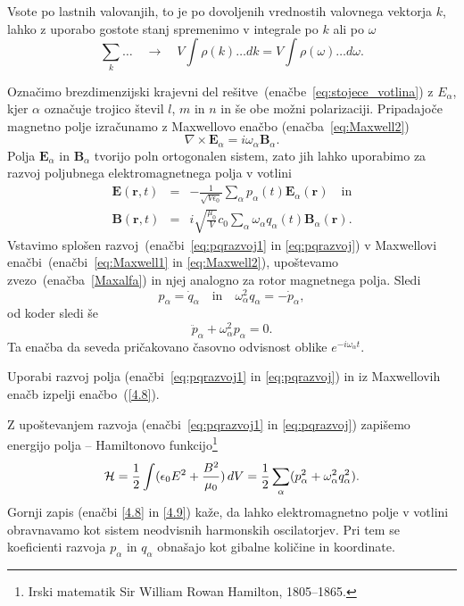 Vsote po lastnih valovanjih, to je po dovoljenih vrednostih valovnega vektorja $k$,
lahko z uporabo gostote stanj spremenimo v integrale po $k$ ali po $\omega$
\begin{equation}
\sum_{k}\ldots \quad \rightarrow \quad V\int\rho(k)\ldots dk=V\int\rho(\omega)\ldots d\omega.
\label{4.5}
\end{equation}

Označimo brezdimenzijski krajevni del rešitve~(enačbe~\ref{eq:stojece_votlina}) z 
$E_{\alpha}$, kjer $\alpha$
označuje trojico števil $l$, $m$ in $n$ in še obe možni polarizaciji. 
Pripadajoče magnetno polje izračunamo z Maxwellovo enačbo (enačba~\ref{eq:Maxwell2}) 
\begin{equation}
\nabla\times\mathbf{E}_{\alpha}=i\omega_\alpha\mathbf{B}_{\alpha}.
\label{Maxalfa}
\end{equation}
Polja $\mathbf{E}_{\alpha}$ in $\mathbf{B}_{\alpha}$ tvorijo poln ortogonalen
sistem, zato jih lahko uporabimo za razvoj poljubnega elektromagnetnega polja v votlini
\begin{eqnarray}
\mathbf{E}(\mathbf{r},t) & = & -\frac{1}{\sqrt{V\epsilon_{0}}}
\sum_{\alpha}p_{\alpha}(t)\mathbf{E}_{\alpha}(\mathbf{r}) \quad \mathrm{in} \label{eq:pqrazvoj1}\\
\mathbf{B}(\mathbf{r},t) & = & i\sqrt{\frac{\mu_{0}}{V}}c_0\sum_{\alpha}
\omega_{\alpha}q_{\alpha}(t)\mathbf{B}_{\alpha}(\mathbf{r}).
\label{eq:pqrazvoj}
\end{eqnarray}
Vstavimo splošen razvoj~(enačbi~\ref{eq:pqrazvoj1} in \ref{eq:pqrazvoj}) v 
Maxwellovi enačbi~(enačbi~\ref{eq:Maxwell1} in \ref{eq:Maxwell2}), upoštevamo zvezo~(enačba~\ref{Maxalfa}) in njej analogno za rotor magnetnega polja. Sledi
\begin{equation}
p_{\alpha}=\dot{q}_{\alpha} \quad \mathrm{in} \quad 
\omega_{\alpha}^{2}q_{\alpha}=-\dot{p}_{\alpha},
\label{4.7}
\end{equation}
od koder sledi še 
\begin{equation}
\ddot{p}_{\alpha}+\omega_{\alpha}^{2}p_{\alpha}=0.
\label{4.8}
\end{equation}
Ta enačba da seveda pričakovano časovno odvisnost oblike $e^{-i \omega_\alpha t}$.

\begin{definition}
 Uporabi razvoj polja (enačbi~\ref{eq:pqrazvoj1} in \ref{eq:pqrazvoj}) 
 in iz Maxwellovih enačb izpelji
 enačbo~(\ref{4.8}).
\end{definition}

Z upoštevanjem razvoja (enačbi~\ref{eq:pqrazvoj1} in \ref{eq:pqrazvoj}) zapišemo energijo 
polja -- Hamiltonovo 
funkcijo\footnote{Irski matematik Sir William Rowan Hamilton, 1805--1865.}
\begin{equation}
{\cal H}=\frac{1}{2}\int(\epsilon_{0}E^{2}+\frac{B^{2}}{\mu_0})\, 
dV=\frac{1}{2}\sum_{\alpha}(p_{\alpha}^{2}+\omega_{\alpha}^{2}q_{\alpha}^{2}).
\label{4.9}
\end{equation}
Gornji zapis (enačbi \ref{4.8} in \ref{4.9}) kaže, 
da lahko elektromagnetno polje v votlini
obravnavamo kot sistem neodvisnih harmonskih oscilatorjev. 
Pri tem se koeficienti razvoja $p_{\alpha}$ in $q_{\alpha}$ obnašajo kot
gibalne količine in koordinate. 

